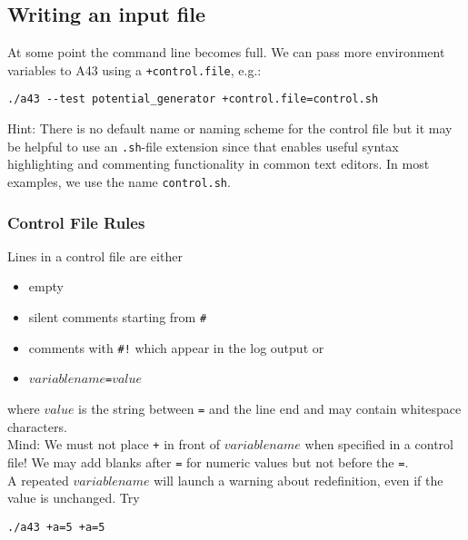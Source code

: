 \documentclass[oribibl]{llncs}
\newcommand{\ttt}[1]{\texttt{#1}}
\newcommand{\codename}{A43}
\begin{document}
%
\subsection{Writing an input file} \label{sec:control-file}
%
At some point the command line becomes full.
We can pass more environment variables to \codename{} using a \ttt{+control.file}, e.g.:
\begin{verbatim}
./a43 --test potential_generator +control.file=control.sh
\end{verbatim}
Hint: There is no default name or naming scheme for the control file 
but it may be helpful to use an \ttt{.sh}-file extension since that
enables useful syntax highlighting and commenting functionality in common text editors.
In most examples, we use the name \ttt{control.sh}.
%
%

\subsubsection{Control File Rules} \label{sec:control-file-rules}
%
Lines in a control file are either 
\begin{itemize}
    \item empty
    \item silent comments starting from \ttt{\#}
    \item comments with \ttt{\#!} which appear in the log output or
    \item $variablename$\ttt{=}$value$
\end{itemize}
where $value$ is the string between \ttt{=} and the line end and may contain whitespace characters.
\\
Mind: We must not place \ttt{+} in front of $variablename$ when specified in a control file!
We may add blanks after \ttt{=} for numeric values but not before the \ttt{=}.
\\
A repeated $variablename$ will launch a warning about redefinition, even if the value is unchanged. Try
\begin{verbatim}
./a43 +a=5 +a=5
\end{verbatim}
\end{document}
